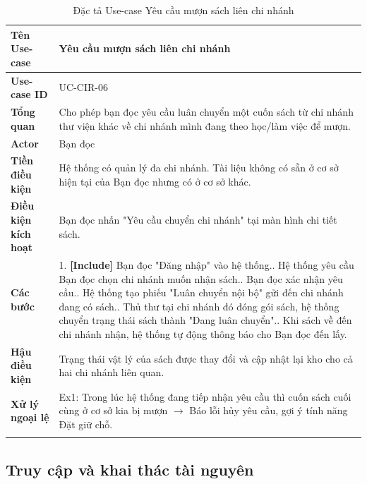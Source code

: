 \newpage
\begin{longtable}{|p{3.5cm}|p{11.5cm}|}
    \hline
    \textbf{Tên Use-case} & \textbf{Yêu cầu mượn sách liên chi nhánh} \\
    \hline
    \textbf{Use-case ID} & UC-CIR-06 \\
    \hline
    \textbf{Tổng quan} & Cho phép bạn đọc yêu cầu luân chuyển một cuốn sách từ chi nhánh thư viện khác về chi nhánh mình đang theo học/làm việc để mượn. \\
    \hline
    \textbf{Actor} & Bạn đọc \\
    \hline
    \textbf{Tiền điều kiện} & Hệ thống có quản lý đa chi nhánh. Tài liệu không có sẵn ở cơ sở hiện tại của Bạn đọc nhưng có ở cơ sở khác. \\
    \hline
    \textbf{Điều kiện kích hoạt} & Bạn đọc nhấn "Yêu cầu chuyển chi nhánh" tại màn hình chi tiết sách. \\
    \hline
    \textbf{Các bước} & 
    1. \textbf{[Include]} Bạn đọc "Đăng nhập" vào hệ thống.\newline
    2. Hệ thống yêu cầu Bạn đọc chọn chi nhánh muốn nhận sách.\newline
    3. Bạn đọc xác nhận yêu cầu.\newline
    4. Hệ thống tạo phiếu "Luân chuyển nội bộ" gửi đến chi nhánh đang có sách.\newline
    5. Thủ thư tại chi nhánh đó đóng gói sách, hệ thống chuyển trạng thái sách thành "Đang luân chuyển".\newline
    6. Khi sách về đến chi nhánh nhận, hệ thống tự động thông báo cho Bạn đọc đến lấy. \\
    \hline
    \textbf{Hậu điều kiện} & Trạng thái vật lý của sách được thay đổi và cập nhật lại kho cho cả hai chi nhánh liên quan. \\
    \hline
    \textbf{Xử lý ngoại lệ} & 
    Ex1: Trong lúc hệ thống đang tiếp nhận yêu cầu thì cuốn sách cuối cùng ở cơ sở kia bị mượn $\rightarrow$ Báo lỗi hủy yêu cầu, gợi ý tính năng Đặt giữ chỗ. \\
    \hline
    \caption{Đặc tả Use-case Yêu cầu mượn sách liên chi nhánh}
\end{longtable}


\subsection{Truy cập và khai thác tài nguyên}

